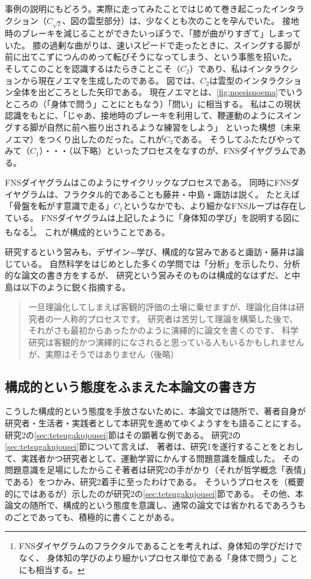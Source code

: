 事例の説明にもどろう。実際に走ってみたことではじめて巻き起こったインタラクション（$ C_{\sqrt{2}} $、図の雲型部分）は、少なくとも次のことを孕んでいた。
接地時のブレーキを減じることができたいっぽうで、「膝が曲がりすぎて」しまっていた。
膝の過剰な曲がりは、速いスピードで走ったときに、スイングする脚が前に出てこずにつんのめって転びそうになってしまう、という事態を招いた。
そしてこのことを認識するはたらきことこそ（$C_2$）であり、私はインタラクションから現在ノエマを生成したのである。
図では、$C_2$は雲型のインタラクション全体を出どころとした矢印である。
現在ノエマとは、\autoref{fig:noesisnoema}でいうところの（「身体で問う」ことにともなう）「問い」に相当する。
私はこの現状認識をもとに、「じゃあ、接地時のブレーキを利用して、鞭運動のようにスイングする脚が自然に前へ振り出されるような練習をしよう」
といった構想（未来ノエマ）をつくり出したのだった。これが$C_3$である。
そうしてふたたびやってみて（$C_1$）・・・（以下略）といったプロセスをなすのが、FNSダイヤグラムである。

FNSダイヤグラムはこのようにサイクリックなプロセスである。
同時にFNSダイヤグラムは、フラクタル的であることも藤井・中島・諏訪は説く。
たとえば「骨盤を転がす意識で走る」$C_1$というなかでも、より細かなFNSループは存在している。
FNSダイヤグラムは上記したように「身体知の学び」を説明する図にもなる\footnote{
  FNSダイヤグラムのフラクタルであることを考えれば、身体知の学びだけでなく、
  身体知の学びのより細かいプロセス単位である「身体で問う」ことにも相当する。
}。
これが構成的ということである。

研究するという営みも、デザイン=学び、構成的な営みであると諏訪・藤井\cite{suwa_fujii:2015}は論じている。
自然科学をはじめとした多くの学問では「分析」を示したり、分析的な論文の書き方をするが、
研究という営みそのものは構成的なはずだ、と中島は以下のように鋭く指摘する。
\begin{quote}
  一旦理論化してしまえば客観的評価の土壌に乗せますが、理論化自体は研究者の一人称的プロセスです。
  研究者は苦労して理論を構築した後で、それがさも最初からあったかのように演繹的に論文を書くのです、
  科学研究は客観的かつ演繹的になされると思っている人もいるかもしれませんが、実際はそうではありません（後略）
\end{quote}
\subsection{構成的という態度をふまえた本論文の書き方}
こうした構成的という態度を手放さないために、本論文では随所で、著者自身が研究者・生活者・実践者として本研究を進めてゆくようすをも語ることにする。
研究2の\ref{sec:tetsugakujousei}節はその顕著な例である。
研究2の\ref{sec:tetsugakujousei}節について言えば、
著者は、研究1を遂行することをとおして、実践者かつ研究者として、運動学習にかんする問題意識を醸成した。
その問題意識を足場にしたからこそ著者は研究2の手がかり（それが哲学概念「表情」\cite{hiromatsu:1989}である）をつかみ、研究2着手に至ったわけである。
そういうプロセスを（概要的にではあるが）示したのが研究2の\ref{sec:tetsugakujousei}節である。
その他、本論文の随所で、構成的という態度を意識し、通常の論文では省かれるであろうものごとであっても、積極的に書くことがある。
